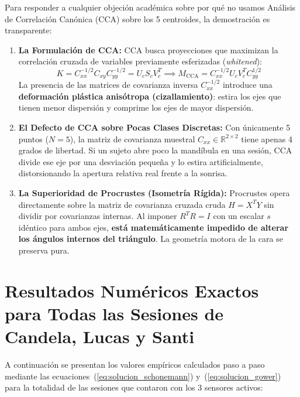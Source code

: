 \documentclass[11pt,a4paper,openany]{book}
\theoremstyle{definition}
\begin{document}
Para responder a cualquier objeción académica sobre por qué no usamos Análisis de Correlación Canónica (CCA) sobre los 5 centroides, la demostración es transparente:

\begin{enumerate}
    \item \textbf{La Formulación de CCA:}
    CCA busca proyecciones que maximizan la correlación cruzada de variables previamente esferizadas (\textit{whitened}):
    $$K = C_{xx}^{-1/2} C_{xy} C_{yy}^{-1/2} = U_c S_c V_c^T \implies M_{\text{CCA}} = C_{xx}^{-1/2} U_c V_c^T C_{yy}^{1/2}$$
    La presencia de las matrices de covarianza inversa $C_{xx}^{-1/2}$ introduce una \textbf{deformación plástica anisótropa (cizallamiento)}: estira los ejes que tienen menor dispersión y comprime los ejes de mayor dispersión.
    \item \textbf{El Defecto de CCA sobre Pocas Clases Discretas:}
    Con únicamente 5 puntos ($N = 5$), la matriz de covarianza muestral $C_{xx} \in \mathbb{R}^{2 \times 2}$ tiene apenas 4 grados de libertad. Si un sujeto abre poco la mandíbula en una sesión, CCA divide ese eje por una desviación pequeña y lo estira artificialmente, distorsionando la apertura relativa real frente a la sonrisa.
    \item \textbf{La Superioridad de Procrustes (Isometría Rígida):}
    Procrustes opera directamente sobre la matriz de covarianza cruzada cruda $H = X^T Y$ sin dividir por covarianzas internas. Al imponer $R^T R = I$ con un escalar $s$ idéntico para ambos ejes, \textbf{está matemáticamente impedido de alterar los ángulos internos del triángulo}. La geometría motora de la cara se preserva pura.
\end{enumerate}

\section{Resultados Numéricos Exactos para Todas las Sesiones de Candela, Lucas y Santi}
\label{sec:tabla_valores_reales}

A continuación se presentan los valores empíricos calculados paso a paso mediante las ecuaciones~(\ref{eq:solucion_schonemann}) y~(\ref{eq:solucion_gower}) para la totalidad de las sesiones que contaron con los 3 sensores activos:
\end{document}
